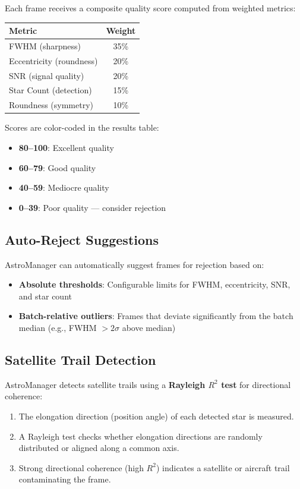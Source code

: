 \documentclass[11pt,a4paper]{article}
\begin{document}
Each frame receives a composite quality score computed from weighted metrics:

\begin{center}
\begin{tabular}{lc}
\toprule
\textbf{Metric} & \textbf{Weight} \\
\midrule
FWHM (sharpness) & 35\% \\
Eccentricity (roundness) & 20\% \\
SNR (signal quality) & 20\% \\
Star Count (detection) & 15\% \\
Roundness (symmetry) & 10\% \\
\bottomrule
\end{tabular}
\end{center}

Scores are color-coded in the results table:
\begin{itemize}
    \item \textcolor{successgreen}{\textbf{80--100}}: Excellent quality
    \item \textcolor{accentcyan}{\textbf{60--79}}: Good quality
    \item \textcolor{warningorange}{\textbf{40--59}}: Mediocre quality
    \item \textcolor{errorcoral}{\textbf{0--39}}: Poor quality --- consider rejection
\end{itemize}

\subsection{Auto-Reject Suggestions}

AstroManager can automatically suggest frames for rejection based on:
\begin{itemize}
    \item \textbf{Absolute thresholds}: Configurable limits for FWHM, eccentricity, SNR, and star count
    \item \textbf{Batch-relative outliers}: Frames that deviate significantly from the batch median (e.g., FWHM $> 2\sigma$ above median)
\end{itemize}

\subsection{Satellite Trail Detection}

AstroManager detects satellite trails using a \textbf{Rayleigh $R^2$ test} for directional coherence:
\begin{enumerate}
    \item The elongation direction (position angle) of each detected star is measured.
    \item A Rayleigh test checks whether elongation directions are randomly distributed or aligned along a common axis.
    \item Strong directional coherence (high $R^2$) indicates a satellite or aircraft trail contaminating the frame.
\end{enumerate}
\end{document}

